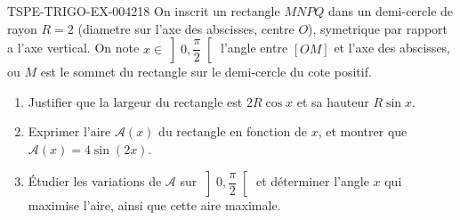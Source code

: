 \begin{exercice}{TSPE-TRIGO-EX-004}{2}{18}
On inscrit un rectangle $MNPQ$ dans un demi-cercle de rayon $R=2$ (diametre sur l'axe des abscisses, centre $O$), symetrique par rapport a l'axe vertical. On note $x \in \left]0, \dfrac{\pi}{2}\right[$ l'angle entre $[OM]$ et l'axe des abscisses, ou $M$ est le sommet du rectangle sur le demi-cercle du cote positif.
\begin{enumerate}
  \item Justifier que la largeur du rectangle est $2R\cos x$ et sa hauteur $R \sin x$.
  \item Exprimer l'aire $\mathcal{A}(x)$ du rectangle en fonction de $x$, et montrer que $\mathcal{A}(x) = 4\sin(2x)$.
  \item Étudier les variations de $\mathcal{A}$ sur $\left]0, \dfrac{\pi}{2}\right[$ et déterminer l'angle $x$ qui maximise l'aire, ainsi que cette aire maximale.
\end{enumerate}
\end{exercice}
